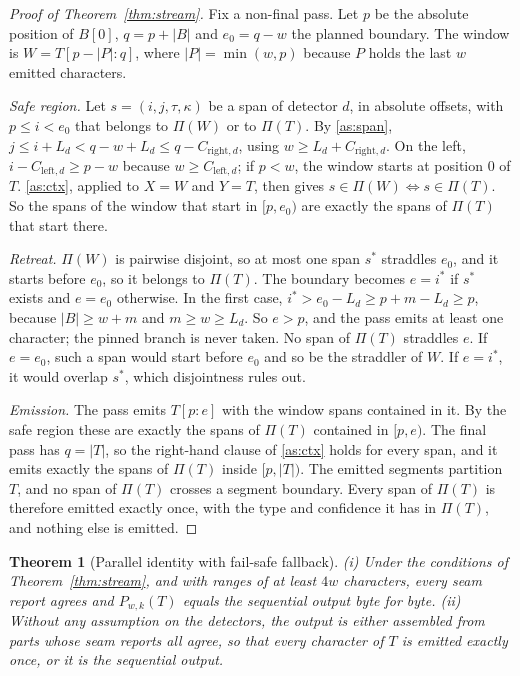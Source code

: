 \documentclass[pdflatex,sn-mathphys-num]{sn-jnl}
\theoremstyle{thmstyleone}
\newtheorem{theorem}{Theorem}
\theoremstyle{thmstylethree}
\begin{document}
\begin{proof}[Proof of Theorem~\ref{thm:stream}]
Fix a non-final pass. Let $p$ be the absolute position of $B[0]$, $q = p + |B|$ and $e_0 = q - w$ the planned boundary. The window is $W = T[p - |P| : q]$, where $|P| = \min(w, p)$ because $P$ holds the last $w$ emitted characters.

\emph{Safe region.} Let $s = (i, j, \tau, \kappa)$ be a span of detector $d$, in absolute offsets, with $p \le i < e_0$ that belongs to $\Pi(W)$ or to $\Pi(T)$. By \ref{as:span}, $j \le i + L_d < q - w + L_d \le q - C_{\mathrm{right},d}$, using $w \ge L_d + C_{\mathrm{right},d}$. On the left, $i - C_{\mathrm{left},d} \ge p - w$ because $w \ge C_{\mathrm{left},d}$; if $p < w$, the window starts at position 0 of $T$. \ref{as:ctx}, applied to $X = W$ and $Y = T$, then gives $s \in \Pi(W) \Leftrightarrow s \in \Pi(T)$. So the spans of the window that start in $[p, e_0)$ are exactly the spans of $\Pi(T)$ that start there.

\emph{Retreat.} $\Pi(W)$ is pairwise disjoint, so at most one span $s^{*}$ straddles $e_0$, and it starts before $e_0$, so it belongs to $\Pi(T)$. The boundary becomes $e = i^{*}$ if $s^{*}$ exists and $e = e_0$ otherwise. In the first case, $i^{*} > e_0 - L_d \ge p + m - L_d \ge p$, because $|B| \ge w + m$ and $m \ge w \ge L_d$. So $e > p$, and the pass emits at least one character; the pinned branch is never taken. No span of $\Pi(T)$ straddles $e$. If $e = e_0$, such a span would start before $e_0$ and so be the straddler of $W$. If $e = i^{*}$, it would overlap $s^{*}$, which disjointness rules out.

\emph{Emission.} The pass emits $T[p{:}e]$ with the window spans contained in it. By the safe region these are exactly the spans of $\Pi(T)$ contained in $[p, e)$. The final pass has $q = |T|$, so the right-hand clause of \ref{as:ctx} holds for every span, and it emits exactly the spans of $\Pi(T)$ inside $[p, |T|)$. The emitted segments partition $T$, and no span of $\Pi(T)$ crosses a segment boundary. Every span of $\Pi(T)$ is therefore emitted exactly once, with the type and confidence it has in $\Pi(T)$, and nothing else is emitted.
\end{proof}

\begin{theorem}[Parallel identity with fail-safe fallback]\label{thm:par}
(i) Under the conditions of Theorem~\ref{thm:stream}, and with ranges of at least $4w$ characters, every seam report agrees and $P_{w,k}(T)$ equals the sequential output byte for byte. (ii) Without any assumption on the detectors, the output is either assembled from parts whose seam reports all agree, so that every character of $T$ is emitted exactly once, or it is the sequential output.
\end{theorem}
\end{document}
